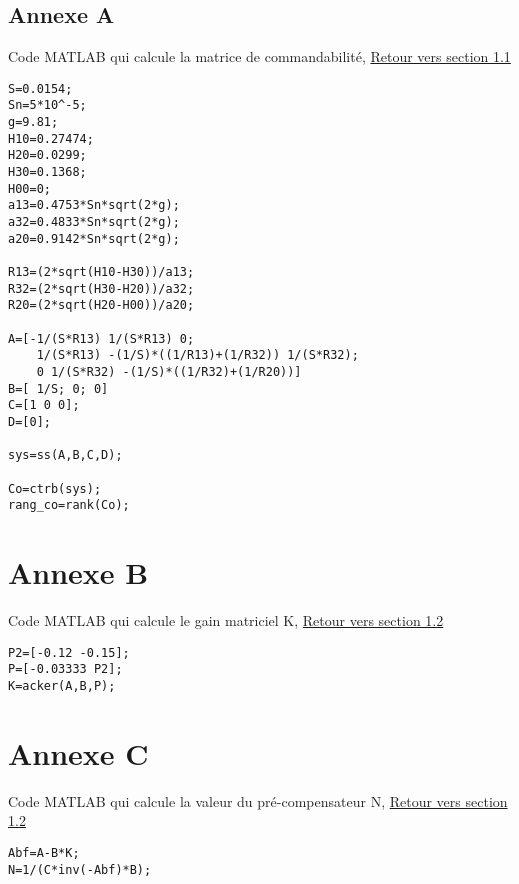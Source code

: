 \begin{appendices}

\chapter*{Annexe A}
	
	Code MATLAB qui calcule la matrice de commandabilité,\label{Annexe A} \hyperref[Co]{Retour vers section 1.1}
	
	\begin{lstlisting}	
S=0.0154;
Sn=5*10^-5;
g=9.81;
H10=0.27474;
H20=0.0299;
H30=0.1368;
H00=0;
a13=0.4753*Sn*sqrt(2*g);
a32=0.4833*Sn*sqrt(2*g);
a20=0.9142*Sn*sqrt(2*g);

R13=(2*sqrt(H10-H30))/a13;
R32=(2*sqrt(H30-H20))/a32;
R20=(2*sqrt(H20-H00))/a20;

A=[-1/(S*R13) 1/(S*R13) 0;
    1/(S*R13) -(1/S)*((1/R13)+(1/R32)) 1/(S*R32);
    0 1/(S*R32) -(1/S)*((1/R32)+(1/R20))]
B=[ 1/S; 0; 0]
C=[1 0 0];
D=[0];

sys=ss(A,B,C,D);

Co=ctrb(sys);
rang_co=rank(Co);
	\end{lstlisting}

\end{appendices}


\chapter*{Annexe B}
	
	Code MATLAB qui calcule le gain matriciel K,\label{Annexe B} \hyperref[K]{Retour vers section 1.2}
	
	\begin{lstlisting}	
P2=[-0.12 -0.15];
P=[-0.03333 P2];
K=acker(A,B,P); 
	\end{lstlisting}	
	
\chapter*{Annexe C}
	
	Code MATLAB qui calcule la valeur du pré-compensateur N,\label{Annexe C} \hyperref[N]{Retour vers section 1.2}
	
	\begin{lstlisting}	
Abf=A-B*K;
N=1/(C*inv(-Abf)*B);
	\end{lstlisting}		

